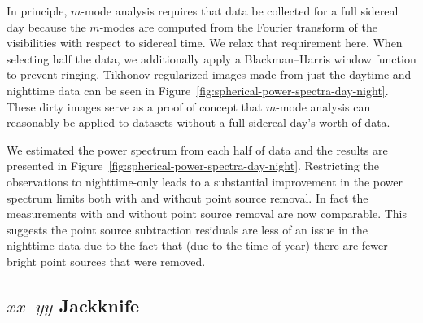 \documentclass[twocolumn]{aastex62}
\begin{document}
In principle, $m$-mode analysis requires that data be collected for a full sidereal day because the
$m$-modes are computed from the Fourier transform of the visibilities with respect to sidereal time.
We relax that requirement here.  When selecting half the data, we additionally apply a
Blackman--Harris window function to prevent ringing. Tikhonov-regularized images made from just the
daytime and nighttime data can be seen in Figure~\ref{fig:spherical-power-spectra-day-night}. These
dirty images serve as a proof of concept that $m$-mode analysis can reasonably be applied to
datasets without a full sidereal day's worth of data.

We estimated the power spectrum from each half of data and the results are presented in
Figure~\ref{fig:spherical-power-spectra-day-night}. Restricting the observations to nighttime-only
leads to a substantial improvement in the power spectrum limits both with and without point source
removal. In fact the measurements with and without point source removal are now comparable. This
suggests the point source subtraction residuals are less of an issue in the nighttime data due to
the fact that (due to the time of year) there are fewer bright point sources that were removed.

\subsection{$xx$--$yy$ Jackknife}
\end{document}
